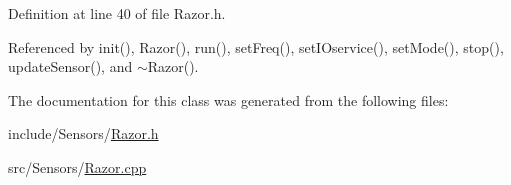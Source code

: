 Definition at line 40 of file Razor.\+h.



Referenced by init(), Razor(), run(), set\+Freq(), set\+I\+Oservice(), set\+Mode(), stop(), update\+Sensor(), and $\sim$\+Razor().



The documentation for this class was generated from the following files\+:\begin{DoxyCompactItemize}
\item 
include/\+Sensors/\hyperlink{_razor_8h}{Razor.\+h}\item 
src/\+Sensors/\hyperlink{_razor_8cpp}{Razor.\+cpp}\end{DoxyCompactItemize}
